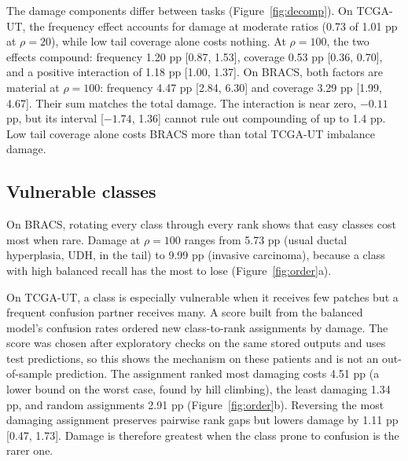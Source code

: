 \documentclass[11pt]{article}
\begin{document}
\noindent The damage components differ between tasks (Figure~\ref{fig:decomp}). On TCGA-UT, the frequency effect accounts for damage at moderate ratios (0.73 of 1.01 pp at $\rho=20$), while low tail coverage alone costs nothing. At $\rho=100$, the two effects compound: frequency 1.20 pp [0.87, 1.53], coverage 0.53 pp [0.36, 0.70], and a positive interaction of 1.18 pp [1.00, 1.37]. On BRACS, both factors are material at $\rho=100$: frequency 4.47 pp [2.84, 6.30] and coverage 3.29 pp [1.99, 4.67]. Their sum matches the total damage. The interaction is near zero, $-0.11$ pp, but its interval [$-1.74$, 1.36] cannot rule out compounding of up to 1.4 pp. Low tail coverage alone costs BRACS more than total TCGA-UT imbalance damage.

\subsection{Vulnerable classes}
\label{sec:vulnerable}
On BRACS, rotating every class through every rank shows that easy classes cost most when rare. Damage at $\rho=100$ ranges from 5.73 pp (usual ductal hyperplasia, UDH, in the tail) to 9.99 pp (invasive carcinoma), because a class with high balanced recall has the most to lose (Figure~\ref{fig:order}a).

On TCGA-UT, a class is especially vulnerable when it receives few patches but a frequent confusion partner receives many. A score built from the balanced model's confusion rates ordered new class-to-rank assignments by damage. The score was chosen after exploratory checks on the same stored outputs and uses test predictions, so this shows the mechanism on these patients and is not an out-of-sample prediction. The assignment ranked most damaging costs 4.51 pp (a lower bound on the worst case, found by hill climbing), the least damaging 1.34 pp, and random assignments 2.91 pp (Figure~\ref{fig:order}b). Reversing the most damaging assignment preserves pairwise rank gaps but lowers damage by 1.11 pp [0.47, 1.73]. Damage is therefore greatest when the class prone to confusion is the rarer one.
\end{document}
